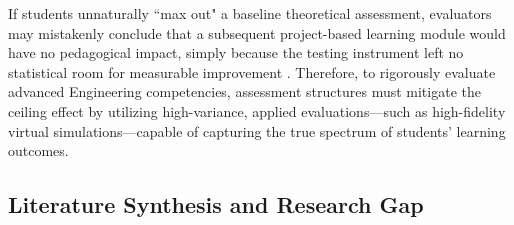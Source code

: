 \documentclass[journal]{IEEEtran}
\begin{document}
If students unnaturally ``max out" a baseline theoretical assessment, evaluators may mistakenly conclude that a subsequent project-based learning module would have no pedagogical impact, simply because the testing instrument left no statistical room for measurable improvement \cite{Staus2021}. Therefore, to rigorously evaluate advanced Engineering competencies, assessment structures must mitigate the ceiling effect by utilizing high-variance, applied evaluations—such as high-fidelity virtual simulations—capable of capturing the true spectrum of students' learning outcomes.



\subsection{Literature Synthesis and Research Gap}\label{subsec:gap-contribution}%


\end{document}
